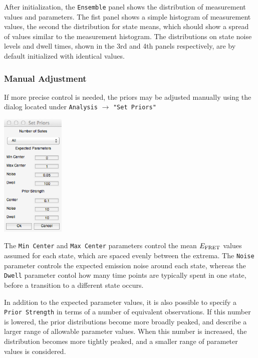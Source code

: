 \documentclass[12pt,article,oldfontcommands]{memoir}
\newcommand{\indt}{\qquad}
\begin{document}
After initialization, the \texttt{Ensemble} panel shows the distribution of measurement values and parameters. The fist panel shows a simple histogram of measurement values, the second the distribution for state means, which should show a spread of values similar to the measurement histogram. The distributions on state noise levels and dwell times, shown in the 3rd and 4th panels respectively, are by default initialized with identical values.

\subsubsection{Manual Adjustment}

If more precise control is needed, the priors may be adjusted manually using the dialog located under \texttt{Analysis} $\to$ \texttt{"Set Priors"} 

\indt\includegraphics[width=1.2in]{images/set_priors_dialog}

The \texttt{Min Center} and \texttt{Max Center} parameters control the mean $E_{\rm FRET}$ values assumed for each state, which are spaced evenly between the extrema. The \texttt{Noise} parameter controls the expected emission noise around each state, whereas the \texttt{Dwell} parameter contol how many time points are typically spent in one state, before a transition to a different state occurs.

In addition to the expected parameter values, it is also possible to specify a \texttt{Prior Strength} in terms of a number of equivalent observations. If this number is lowered, the prior distributions become more broadly peaked, and describe a larger range of allowable parameter values. When this number is increased, the distribution becomes more tightly peaked, and a smaller range of parameter values is considered.
\end{document}
